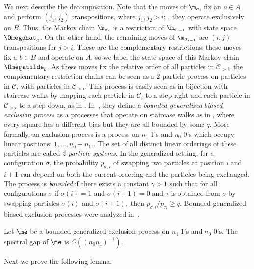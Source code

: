 We next describe the decomposition.  Note that the moves of 
$\m_{\sigma_i}$ fix an $a \in A$ and 
perform $(j_1,j_2)$ transpositions, where $j_1,j_2>i$; \ie,  they 
operate exclusively on $B$. Thus, the Markov chain $\m_{\sigma_i}$ is a 
restriction of $\m_{\sigma_{i-1}}$ with state space 
$\Omegahat_{a}$.
On the other hand, the remaining moves of $\m_{\sigma_{i-1}}$ 
are $(i,j)$ transpositions for $j>i$.  These are the complementary 
restrictions; these moves fix a $b \in B$ and operate on $A$, so we 
label the state space of this Markov chain $\Omegatilde_b$.  As these 
moves fix the relative order of all particles in $\mathcal{C}_{>i}$, 
the complementary restriction chains can be seen as a 2-particle process on particles in $\mathcal{C}_{i}$  with particles in $\mathcal{C}_{> i}$.  This process is easily seen as in bijection with staircase walks by mapping each particle in $\mathcal{C}_{i}$ to a step right and each particle in $\mathcal{C}_{> i}$ to a step down, as in .  
In~\cite{MS}, they define a \emph{bounded generalized biased exclusion process}  as a processes that operate on 
staircase walks as in , where every square 
has a different bias but they are all bounded by some $q$.  More formally, an exclusion process is a process on $n_1$ 1's and $n_0$ 0's which occupy linear positions: $1, \ldots, n_0 + n_1.$. The set of all distinct linear orderings of these particles are called \emph{2-particle systems}.  In the generalized setting, for a configuration $\sigma$, the probability $p_{\sigma, i}$ of swapping two particles at position $i$ and $i+1$  can depend on both the current ordering and the particles being exchanged.  The process is \emph{bounded} if there exists  a constant $\gamma > 1$ such that for all configurations $\sigma$ if $\sigma(i)  =1$ and $\sigma(i+1) = 0$ and $\tau$ is obtained from $\sigma$ by swapping particles $\sigma(i)$ and $\sigma(i+1),$ then $p_{\sigma,i}/p_{\tau_i}\geq q.$  Bounded generalized biased exclusion 
processes were analyzed in~\cite{MS}. 

\begin{theorem}[\cite{MS}]\label{boundedBias} Let $\me$ be a bounded 
generalized exclusion process on $n_1$ 1's and $n_0$ 0's.  The spectral 
gap of $\me$ is $\Omega((n_0n_1)^{-1})$.
\end{theorem}

Next we prove the following lemma.  

